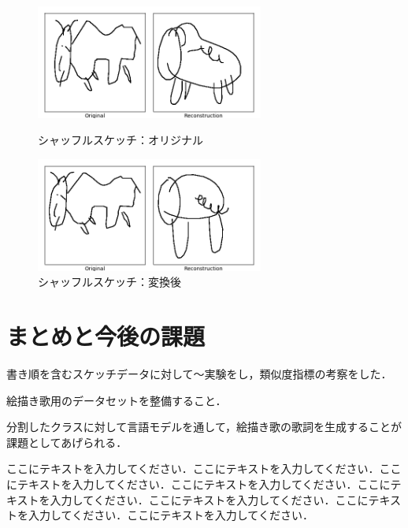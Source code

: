 \documentclass[twocolumn]{jarticle}     %
\begin{document}
\begin{figure}[tb]
 \begin{minipage}{0.5\hsize}
 	\begin{center}
 		\includegraphics[clip,width=75mm]{sketch_tra_shuffle_org_0.png}
 		\caption{シャッフルスケッチ：オリジナル}
 		\label{fig:short}
 	\end{center}
 \end{minipage}
 \begin{minipage}{0.5\hsize}
 	\begin{center}
    \includegraphics[clip,width=75mm]{sketch_tra_shuffle_rvr_0.png}
    \caption{シャッフルスケッチ：変換後}
    \label{fig:param}
 	\end{center}
 \end{minipage}
\end{figure}


\section{まとめと今後の課題}
書き順を含むスケッチデータに対して～実験をし，類似度指標の考察をした．

絵描き歌用のデータセットを整備すること．

分割したクラスに対して言語モデルを通して，絵描き歌の歌詞を生成することが課題としてあげられる．

ここにテキストを入力してください．ここにテキストを入力してください．ここにテキストを入力してください．ここにテキストを入力してください．ここにテキストを入力してください．ここにテキストを入力してください．ここにテキストを入力してください．ここにテキストを入力してください．



\end{document}
